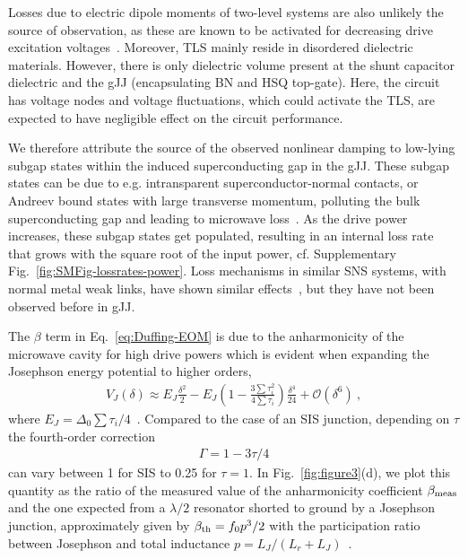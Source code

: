 Losses due to electric dipole moments of two-level systems are also unlikely the source of observation, as these are known to be activated for decreasing drive excitation voltages~\cite{martinisDecoherenceJosephsonQubits2005c,oconnellMicrowaveDielectricLoss2008a,gunnarssonDielectricLossesMultilayer2013}.
%
Moreover, TLS mainly reside in disordered dielectric materials.
%
However, there is only dielectric volume present at the shunt capacitor dielectric and the gJJ (encapsulating BN and HSQ top-gate).
%
Here, the circuit has voltage nodes and voltage fluctuations, which could activate the TLS, are expected to have negligible effect on the circuit performance.

We therefore attribute the source of the observed nonlinear damping to low-lying subgap states within the induced superconducting gap in the gJJ.
%
These subgap states can be due to e.g. intransparent superconductor-normal contacts, or Andreev bound states with large transverse momentum, polluting the bulk superconducting gap and leading to microwave loss~\cite{schmidtBallisticGrapheneSuperconducting2018}.
%
As the drive power increases, these subgap states get populated, resulting in an internal loss rate that grows with the square root of the input power, cf. Supplementary Fig.~\ref{fig:SMFig-lossrates-power}.
%
Loss mechanisms in similar SNS systems, with normal metal weak links, have shown similar effects~\cite{fuechsleEffectMicrowavesCurrentPhase2009,dassonnevilleDissipationSupercurrentFluctuations2013}, but they have not been observed before in gJJ.

The $\beta$ term in Eq.~\ref{eq:Duffing-EOM} is due to the anharmonicity of the microwave cavity for high drive powers which is evident when expanding the Josephson energy potential to higher orders,
\begin{align}
V_J(\delta) \approx E_J \frac{\delta^2}{2} - E_J\left( 1-\frac{3\sum\tau_i^2}{4\sum\tau_i} \right) \frac{\delta^4}{24} +\mathcal{O}(\delta^6)\ , 
\label{eq:EJtaylor}
\end{align}
%
where $E_J=\Delta_0\sum\tau_i/4$~\cite{kringhojAnharmonicitySuperconductingQubit2018}.
%
Compared to the case of an SIS junction, depending on $\tau$ the fourth-order correction 
%
\begin{align}
\Gamma = 1-3\tau/4
\label{eq:Ejcorrection}
\end{align} 
%
can vary between 1 for SIS to 0.25 for $\tau=1$.
%
In Fig.~\ref{fig:figure3}(d), we plot this quantity as the ratio of the measured value of the anharmonicity coefficient $\beta_{\rm meas}$ and the one expected from a $\lambda/2$ resonator shorted to ground by a Josephson junction, approximately given by $\beta_{\rm th}=f_0p^3/2$ with the participation ratio between Josephson and total inductance $p=L_J/(L_r+L_J)$~\cite{wilsonPhotonGenerationElectromagnetic2010b,zhouHighgainWeaklyNonlinear2014}.


